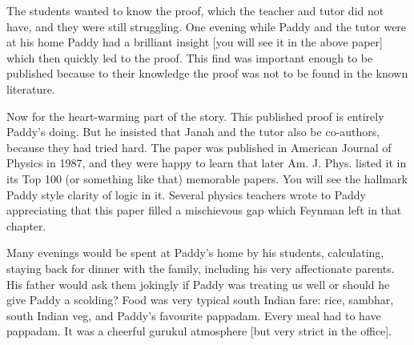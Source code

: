 \documentclass[prd, preprint, longbibliography, 12pt]{revtex4-2}
\begin{document}
The students wanted to know the proof, which the teacher and tutor did not have, and they were still struggling. One evening while Paddy and the tutor were
at his home Paddy had a brilliant insight [you will see it in the above paper] which then quickly led to the proof.
This find was important enough to be published because to their knowledge the proof was not to be found in the known literature. 

Now for the heart-warming part of the story. This published proof is entirely Paddy's doing. But he insisted that Janah and the tutor also be co-authors, because they had tried hard.
The paper was published in American Journal of Physics in 1987, and they were happy to learn that later Am. J. Phys. listed it in its Top 100 (or something like that) memorable papers. You will see the hallmark Paddy style clarity of logic in it. Several physics teachers wrote to Paddy appreciating that this paper filled a mischievous gap which Feynman left in that chapter.

Many evenings would be spent at Paddy's home by his students, calculating, staying back for dinner with the family, including his very affectionate parents. His father would ask them jokingly if Paddy was treating us well or should he give Paddy a scolding?  Food was very typical south Indian fare: rice, sambhar, south Indian veg, and Paddy's favourite pappadam. Every meal had to have pappadam.
It was a cheerful gurukul atmosphere [but very strict in the office].
\end{document}
